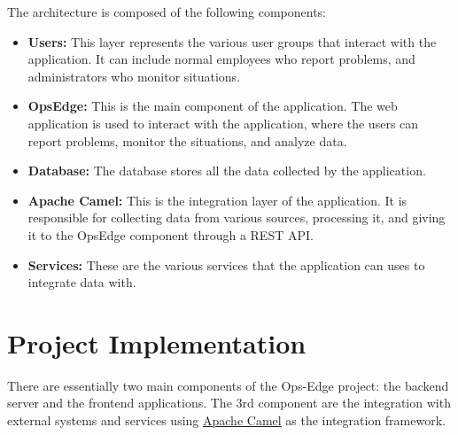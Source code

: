 The architecture is composed of the following components:

\begin{itemize}
    \item \textbf{Users:} This layer represents the various user groups that interact with the application. It can include normal employees who report problems, and administrators who monitor situations.
    \item \textbf{OpsEdge:} This is the main component of the application. The web application is used to interact with the application, where the users can report problems, monitor the situations, and analyze data.
    \item \textbf{Database:} The database stores all the data collected by the application.
    \item \textbf{Apache Camel:} This is the integration layer of the application. It is responsible for collecting data from various sources, processing it, and giving it to the OpsEdge component through a REST API\@.
    \item \textbf{Services:} These are the various services that the application can uses to integrate data with.
\end{itemize}

%
%
\section{Project Implementation}
\label{sec:project_description:project_implementation}
There are essentially two main components of the Ops-Edge project: the backend server and the frontend applications. The 3rd component are the integration with external systems and services using \href{https://camel.apache.org/}{Apache Camel} as the integration framework.

